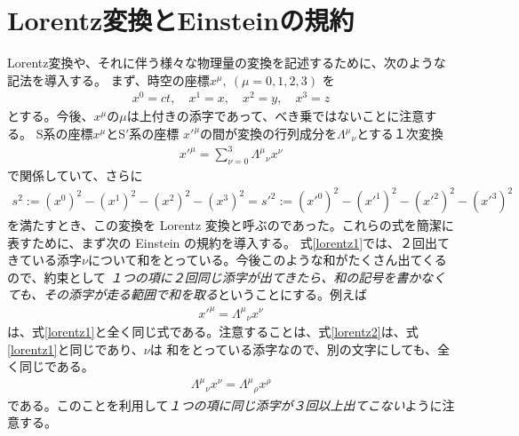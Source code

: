 \documentclass[report,paper=a4, fontsize=12pt, line_length=16cm, number_of_lines=33,dvipdfmx]{jlreq}
\numberwithin{equation}{chapter}
\newcommand{\Sp}{S$'$}
\begin{document}
\section{Lorentz変換とEinsteinの規約}
Lorentz変換や、それに伴う様々な物理量の変換を記述するために、次のような記法を導入する。
まず、時空の座標$x^{\mu},\ (\mu=0,1,2,3)$ を
\begin{align}
x^{0}=ct,\quad x^{1}=x,\quad x^{2}=y,\quad x^{3}=z
\end{align}
とする。今後、$x^{\mu}$の$\mu$は上付きの添字であって、べき乗ではないことに注意する。
S系の座標$x^{\mu}$と\Sp 系の座標 $x'^{\mu}$の間が変換の行列成分を$\Lambda^{\mu}{}_{\nu}$とする１次変換
\begin{align}
 x'^{\mu}=\sum_{\nu=0}^{3}\Lambda^{\mu}{}_{\nu}x^{\nu}
\label{lorentz1}
\end{align}
で関係していて、さらに
\begin{align}
s^{2}
:=(x^{0})^{2}-(x^{1})^{2}-(x^{2})^{2}-(x^{3})^{2}
=s'^{2}
:=(x'^{0})^{2}-(x'^{1})^{2}-(x'^{2})^{2}-(x'^{3})^{2}
\end{align}
を満たすとき、この変換を Lorentz 変換と呼ぶのであった。これらの式を簡潔に表すために、まず次の Einstein の規約を導入する。
式\eqref{lorentz1}では、２回出てきている添字$\nu$について和をとっている。今後このような和がたくさん出てくるので、約束として
\emph{１つの項に２回同じ添字が出てきたら、和の記号を書かなくても、その添字が走る範囲で和を取る}ということにする。例えば
\begin{align}
 x'^{\mu}=\Lambda^{\mu}{}_{\nu}x^{\nu}
\label{lorentz2}
\end{align}
は、式\eqref{lorentz1}と全く同じ式である。注意することは、式\eqref{lorentz2}は、式\eqref{lorentz1}と同じであり、$\nu$は
和をとっている添字なので、別の文字にしても、全く同じである。
\begin{align}
\Lambda^{\mu}{}_{\nu}x^{\nu}
=\Lambda^{\mu}{}_{\rho}x^{\rho}
\end{align}
である。このことを利用して\emph{１つの項に同じ添字が３回以上出てこない}ように注意する。
\end{document}
